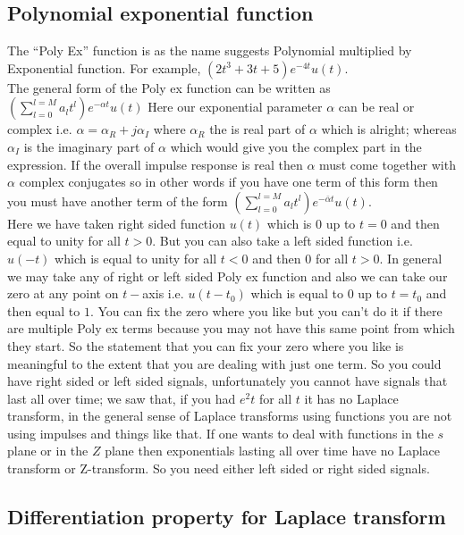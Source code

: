 \subsection{Polynomial exponential function}
The “Poly Ex” function is as the name suggests Polynomial multiplied by Exponential function. For example, $(2t^3+3t+5) e^{-4t}u(t)$.\\
The general form of the Poly ex function can be written as $(\sum_{l=0}^{l=M} a_l t^l )e^{-\alpha t} u(t)$
Here our exponential parameter $\alpha$ can be real or complex i.e.  $\alpha= \alpha_R+ j \alpha_I$ where $\alpha_R$ the is real part of $\alpha$ which is alright; whereas $\alpha_I$  is the imaginary part of $\alpha$ which would give you the complex part in the expression. If the overall impulse response is real then $\alpha$ must come together with $\alpha$ complex conjugates so in other words if you have one term of this form then you must have another term of the form $(\sum_{l=0}^{l=M} a_l t^l )e^{-\bar{\alpha} t} u(t)$.\\
Here we have taken right sided function $u(t)$ which is $0$ up to $t=0$ and then equal to unity for all $t > 0$. But you can also take a left sided function i.e. $u(-t)$ which is equal to unity for all $t < 0$ and then $0$ for all $t > 0$. In general we may take any of right or left sided Poly ex function and also we can take our zero at any point on $t-$axis i.e. $u(t-t_0)$ which is equal to $0$ up to $t = t_0$ and then equal to $1$. You can fix the zero where you like but you can't do it if there are multiple Poly ex terms because you may not have this same point from which they start. So the statement that you can fix your zero where you like is meaningful to the extent that you are dealing with just one term. So you could have right sided or left sided signals, unfortunately you cannot have signals that last all over time; we saw that, if you had $e{^2t}$  for all $t$ it has no Laplace transform, in the general sense of Laplace transforms using functions you are not using impulses and things like that. If one wants to deal with functions in the $s$ plane or in the $Z$ plane then exponentials lasting all over time have no Laplace transform or Z-transform. So you need either left sided or right sided signals.

\subsection{Differentiation property for Laplace transform}


